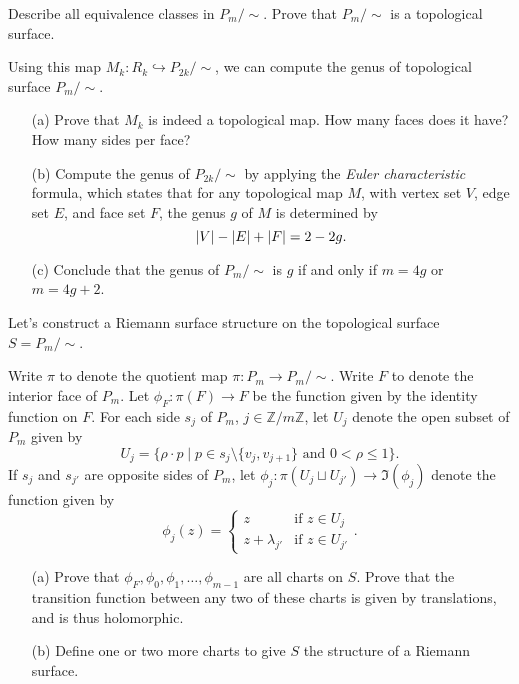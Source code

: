 \documentclass{article}
\begin{document}
\begin{exercise}
Describe all equivalence classes in $P_m/{\sim}$. Prove that $P_m/{\sim}$ is a topological surface.
\end{exercise}

\begin{exercise}
Using this map $M_k :R_k \hookrightarrow P_{2k}/{\sim}$, we can compute the genus of topological surface $P_{m}/{\sim}$.
\begin{enumerate}
    \item[(a)] Prove that $M_k$ is indeed a topological map.  How many faces does it have?  How many sides per face?
    \item[(b)] Compute the genus of $P_{2k}/{\sim}$ by applying the \emph{Euler characteristic} formula, which states that for any topological map $M$, with vertex set $V$, edge set $E$, and face set $F$, the genus $g$ of $M$ is determined by $$\abs{V} - \abs{E} + \abs{F} = 2 - 2g.$$
    \item[(c)] Conclude that the genus of $P_m/{\sim}$ is $g$ if and only if $m = 4g$ or $m=4g+2$.
\end{enumerate}
\end{exercise}

\begin{exercise}\label{exer:charts}
Let's construct a Riemann surface structure on the topological surface $S = P_m/{\sim}$.  

Write $\pi$ to denote the quotient map $\pi : P_m \rightarrow P_m/{\sim}$.
Write $F$ to denote the interior face of $P_m$.  Let $\phi_F: \pi(F) \rightarrow F$ be the function given by the identity function on $F$.
For each side $s_j$ of $P_m$, $j\in\mathbb{Z}/m\mathbb{Z}$, let $U_j$ denote the open subset of $P_m$ given by $$U_j = \{\rho \cdot p \mid p\in s_j\setminus\{v_j,v_{j+1}\} \text{ and } 0 < \rho \leq 1 \}.$$ 
If $s_j$ and $s_{j'}$ are opposite sides of $P_m$, let $\phi_j: \pi(U_j \sqcup U_{j'}) \rightarrow \Im(\phi_j)$ denote the function given by 
$$\phi_j(z) = \begin{cases}
    z & \text{if } z\in U_j\\
    z + \lambda_{j'} & \text{if } z \in U_{j'}
\end{cases}.$$

\begin{itemize}
    \item[(a)] Prove that $\phi_F, \phi_0,\phi_1,\dots , \phi_{m-1}$ are all charts on $S$.  Prove that the transition function between any two of these charts is given by translations, and is thus holomorphic.
    \item[(b)] Define one or two more charts to give $S$ the structure of a Riemann surface.
\end{itemize}
\end{exercise}
\end{document}

